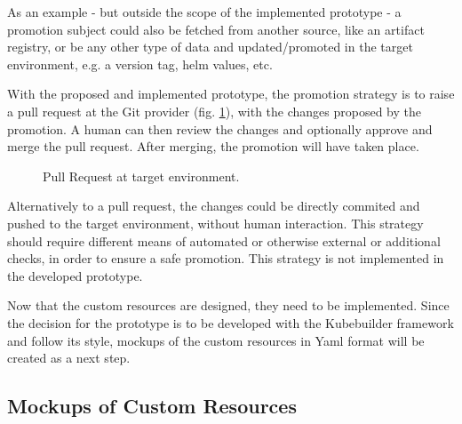As an example - but outside the scope of the implemented prototype -
a promotion subject could also be fetched from another source,
like an artifact registry, or be any other type of data
and updated/promoted in the target environment,
e.g. a version tag, helm values, etc.

With the proposed and implemented prototype,
the promotion strategy is to raise a pull request at the Git provider
(fig. \ref{fig:raise-pull-request-and-approve}),
with the changes proposed by the promotion.
A human can then review the changes and optionally approve and merge the pull request.
After merging, the promotion will have taken place.

\begin{figure}[h]
	\centering
	\caption{Pull Request at target environment.
	}
	\label{fig:raise-pull-request-and-approve}	
\end{figure}

Alternatively to a pull request, the changes could be directly
commited and pushed to the target environment,
without human interaction. This strategy should require different means
of automated or otherwise external or additional checks, in order to ensure a safe promotion.
This strategy is not implemented in the developed prototype.

Now that the custom resources are designed,
they need to be implemented.
Since the decision for the prototype is to be developed
with the Kubebuilder framework and follow its style,
mockups of the custom resources in Yaml format
will be created as a next step.









\subsection{Mockups of Custom Resources}
\label{prototype:design:mockups-custom-resources}

